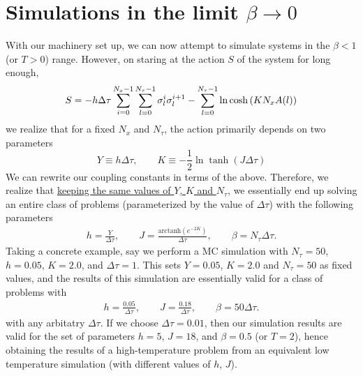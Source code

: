 \documentclass[../thesis_main.tex]{subfiles}
\begin{document}
\section{Simulations in the limit $\beta \to 0$}
With our machinery set up, we can now attempt to simulate systems in the $\beta < 1$ (or $T>0$) range. However, on staring at the action $S$ of the system for long enough,
\[
    S = -h \Delta\tau \sum_{i=0}^{N_x - 1} \sum_{l=0}^{N_\tau -1} \sigma^{i}_{l} \sigma^{i+1}_{l} - \sum_{l=0}^{N_\tau - 1} \ln \cosh \qty(K N_x A(l)) 
\]
we realize that for a fixed $N_x$ and $N_\tau$, the action primarily depends on two parameters
\[
    Y \equiv h \Delta \tau, \qquad K \equiv -\frac{1}{2} \ln \tanh(J \Delta \tau )
\]  
We can rewrite our coupling constants in terms of the above. Therefore, we realize that \ul{keeping the same values of $Y$, $K$ and $N_\tau$}, we essentially end up solving an entire class of problems (parameterized by the value of $\Delta \tau $) with the following parameters
\begin{align*}
    h = \frac{Y}{\Delta \tau}, \qquad J = \frac{\text{arctanh}(e^{-2K})}{\Delta \tau }, \qquad \beta = N_\tau \Delta \tau. 
\end{align*}
Taking a concrete example, say we perform a MC simulation with $N_\tau = 50$, $h = 0.05$, $K = 2.0$, and $\Delta \tau = 1$. This sets $Y = 0.05$, $K = 2.0$ and $N_\tau = 50$ as fixed values, and the results of this simulation are essentially valid for a class of problems with 
\begin{align*}
    h = \frac{0.05}{\Delta \tau}, \qquad J = \frac{0.18}{\Delta \tau }, \qquad \beta = 50 \Delta \tau. 
\end{align*}  
with any arbitatry $\Delta \tau$. If we choose $\Delta \tau = 0.01$, then our simulation results are valid for the set of parameters $h = 5$, $J = 18$, and $\beta = 0.5$ (or $T = 2$), hence obtaining the results of a high-temperature problem from an equivalent low temperature simulation (with different values of $h$, $J$).
\end{document}
